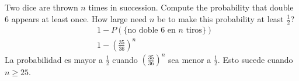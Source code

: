 \item  Two dice are thrown $n$ times in succession. Compute the probability that double 6 appears at least once. How large need $n$ be to make this probability at least $\frac{1}{2}$?
\begin{align*}
    &1 - P(\{\text{no doble 6 en $n$ tiros}\})\\
    &1 - (\tfrac{35}{36})^n
\end{align*}
La probabilidad es mayor a $\tfrac{1}{2}$ cuando $(\tfrac{35}{36})^n$ sea menor a $\tfrac{1}{2}$. Esto sucede cuando $n \ge 25$.